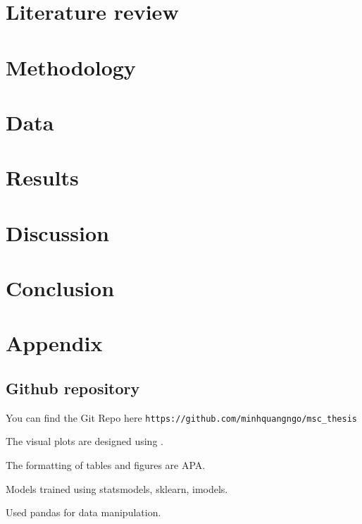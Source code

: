 \documentclass[a4paper,11pt]{article}
\begin{document}
\section{Literature review} \label{sec:litrev}
	
\section{Methodology} \label{sec:method}
    
\section{Data} \label{sec:data}
    
\section{Results} \label{sec:results}
	
\section{Discussion} \label{sec:discussion}
	
\section{Conclusion} \label{sec:conclusion}
	

\newpage
 
 

\newpage
\appendix
\section{Appendix} \label{sec:appendix}
\subsection{Github repository}
You can find the Git Repo here \texttt{https://github.com/minhquangngo/msc\_thesis}

The visual plots are designed using .

The formatting of tables and figures are APA.

Models trained using statsmodels, sklearn, imodels.

Used pandas for data manipulation.


\end{document}
